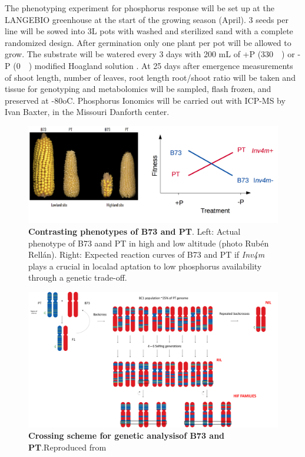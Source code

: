 \documentclass[10pt,letterpaper]{article}
\begin{document}
The phenotyping  experiment for phosphorus response will be set up at the LANGEBIO greenhouse at the start of the growing season (April). 3 seeds per line will be sowed into 3L pots with washed and sterilized sand with a complete randomized design. After germination only one plant per pot will be allowed to grow. The substrate will be watered every 3 days with 200 mL of +P (\SI{330}{\micro\molar}) or -P (\SI{0}{\micro\molar}) modified Hoagland solution \cite{salazar-vidal2016, hoagland1936}.  At 25 days after emergence  measurements of shoot length, number of leaves, root length root/shoot ratio will be taken and tissue for genotyping and metabolomics will be sampled, flash frozen, and preserved at -80oC. Phosphorus Ionomics will be carried out with ICP-MS by Ivan Baxter, in the Missouri Danforth center.



\begin{figure}[!h]
   \includegraphics[width=\textwidth]{cross.png}
   \caption{\textbf{Contrasting phenotypes of B73 and PT}. Left: Actual phenotype of B73 aand PT in high and low altitude (photo Rubén Rellán). Right: Expected reaction curves of B73 and PT if \textit{Inv4m} plays a  crucial in localad aptation to low phosphorus availability through a genetic trade-off. 
  \label{fig:cross} }
\end{figure} 

\begin{figure}[!h]
   \includegraphics[width=\textwidth]{hifs.pdf}
   \caption{\textbf{Crossing scheme for genetic analysisof B73 and PT}.Reproduced from \cite{aguilarrangel2018}}
  \label{fig:hifs} 
\end{figure} 
\end{document}

